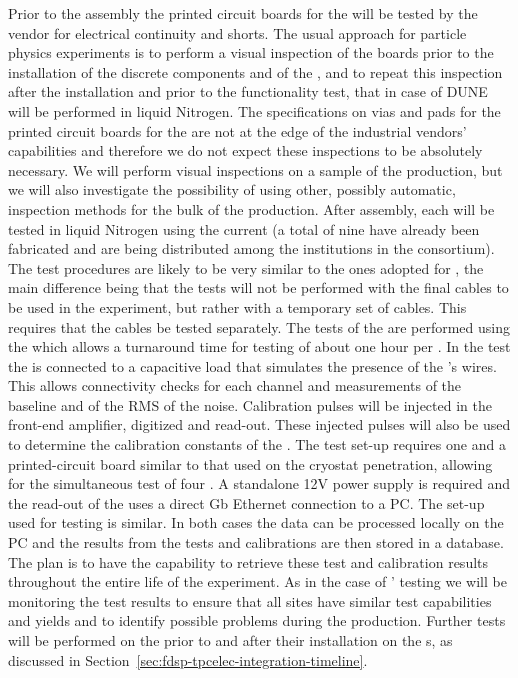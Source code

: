Prior to the assembly the printed circuit boards for the
 will be tested by the vendor for electrical
continuity and shorts. The usual approach for particle physics
experiments is to perform a visual inspection of the boards
prior to the installation of the discrete components and of
the , and to repeat this inspection after the
installation and prior to the functionality test, that in
case of DUNE will be performed in liquid Nitrogen. The
specifications on vias and pads for the printed circuit
boards for the  are not at the edge of the
industrial vendors' capabilities and therefore we do not
expect these inspections to be absolutely necessary. We will
perform visual inspections on a sample of the 
production, but we will also investigate the possibility
of using other, possibly automatic, inspection methods for
the bulk of the production. After assembly, 
each  will be tested in liquid Nitrogen using
the current  (a total of nine have already been
fabricated and are being distributed among the institutions
in the consortium). The test procedures are likely to be
very similar to the ones adopted for , the main
difference being that the tests will not be performed with
the final cables to be used in the experiment, but rather
with a temporary set of cables. This requires that the 
cables be tested separately. The tests of the 
are performed using the  which allows a turnaround
time for testing of about one hour per . In the
test the  is connected to a capacitive load that
simulates the presence of the 's wires. This allows
connectivity checks for each channel and measurements of
the baseline and of the RMS of the noise. Calibration 
pulses will be injected in the front-end amplifier, digitized
and read-out. These injected pulses will also be used
to determine the calibration constants of the . 
The test set-up requires one  and
a printed-circuit board similar to that used on the cryostat
penetration, allowing for the simultaneous test of four .
A standalone 12V power supply is required and the read-out
of the  uses a direct Gb Ethernet connection to
a PC. The set-up used for  testing is similar.
In both cases the data can be processed locally on the PC
and the results from the tests and calibrations are then stored 
in a database. The plan is to have the capability to retrieve  
these test and calibration results throughout the entire life
of the experiment. As in the case of ' testing
we will be monitoring the test results to ensure that all
sites have similar test capabilities and yields and to
identify possible problems during the production.
Further tests will be performed on the 
prior to and after their installation on the s, as
discussed in Section~\ref{sec:fdsp-tpcelec-integration-timeline}.

